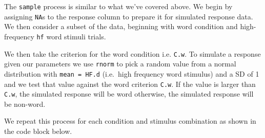 \documentclass[]{book}
\newenvironment{Shaded}{\begin{snugshade}}{\end{snugshade}}
\newcommand{\ControlFlowTok}[1]{\textcolor[rgb]{0.13,0.29,0.53}{\textbf{#1}}}
\newcommand{\DataTypeTok}[1]{\textcolor[rgb]{0.13,0.29,0.53}{#1}}
\newcommand{\DecValTok}[1]{\textcolor[rgb]{0.00,0.00,0.81}{#1}}
\newcommand{\KeywordTok}[1]{\textcolor[rgb]{0.13,0.29,0.53}{\textbf{#1}}}
\newcommand{\NormalTok}[1]{#1}
\newcommand{\OperatorTok}[1]{\textcolor[rgb]{0.81,0.36,0.00}{\textbf{#1}}}
\newcommand{\OtherTok}[1]{\textcolor[rgb]{0.56,0.35,0.01}{#1}}
\newcommand{\StringTok}[1]{\textcolor[rgb]{0.31,0.60,0.02}{#1}}
\begin{document}
The \texttt{sample} process is similar to what we've covered above. We begin by assigning \texttt{NA}s to the response column to prepare it for simulated response data. We then consider a subset of the data, beginning with word condition and high-frequency \texttt{hf} word stimuli trials.

\begin{Shaded}
\end{Shaded}

We then take the criterion for the word condition i.e. \texttt{C.w}. To simulate a response given our parameters we use \texttt{rnorm} to pick a random value from a normal distribution with \texttt{mean\ =\ HF.d} (i.e.~high frequency word stimulus) and a SD of 1 and we test that value against the word criterion \texttt{C.w}. If the value is larger than \texttt{C.w}, the simulated response will be word otherwise, the simulated response will be non-word.

\begin{Shaded}
\end{Shaded}

We repeat this process for each condition and stimulus combination as shown in the code block below.
\end{document}
